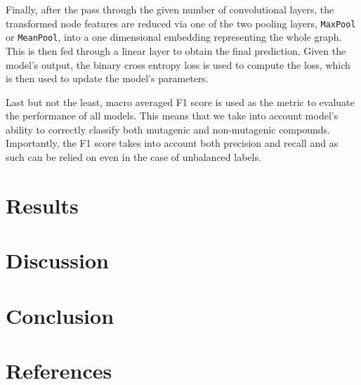 \documentclass[10pt,twocolumn]{article}
\begin{document}
Finally, after the pass through the given number of convolutional layers, the transformed
node features are reduced via one of the two pooling layers, \texttt{MaxPool} or \texttt{MeanPool}, 
into a one dimensional embedding representing the whole graph. This is then fed through
a linear layer to obtain the final prediction. Given the model's output, the binary cross entropy
loss is used to compute the loss, which is then used to update the model's parameters.

Last but not the least, macro averaged F1 score is used as the metric to evaluate the performance
of all models. This means that we take into account model's ability to correctly classify both
mutagenic and non-mutagenic compounds. Importantly, the F1 score takes into account both precision and 
recall and as such can be relied on even in the case of unbalanced labels.

\section{Results}

\section{Discussion}

\section{Conclusion}

\newpage
\section{References}


\end{document}
